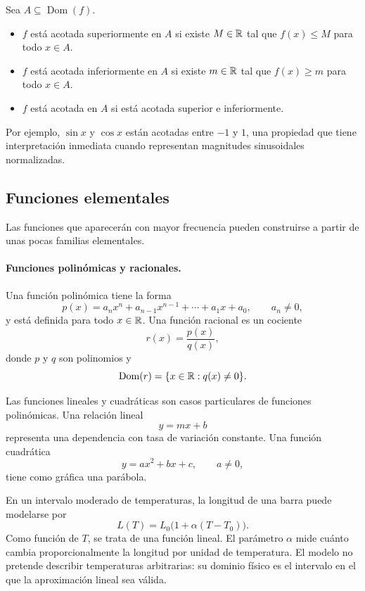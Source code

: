 \begin{definition}[Acotación]
Sea $A\subseteq\operatorname{Dom}(f)$.
\begin{itemize}
\item $f$ está acotada superiormente en $A$ si existe $M\in\mathbb{R}$ tal que $f(x)\leq M$ para todo $x\in A$.
\item $f$ está acotada inferiormente en $A$ si existe $m\in\mathbb{R}$ tal que $f(x)\geq m$ para todo $x\in A$.
\item $f$ está acotada en $A$ si está acotada superior e inferiormente.
\end{itemize}
\end{definition}

Por ejemplo, $\sin x$ y $\cos x$ están acotadas entre $-1$ y $1$, una propiedad que tiene interpretación inmediata cuando representan magnitudes sinusoidales normalizadas.

\subsection{Funciones elementales}

Las funciones que aparecerán con mayor frecuencia pueden construirse a partir de unas pocas familias elementales.

\paragraph{Funciones polinómicas y racionales.}
Una función polinómica tiene la forma
\[
p(x)=a_nx^n+a_{n-1}x^{n-1}+\cdots+a_1x+a_0,
\qquad a_n\neq0,
\]
y está definida para todo $x\in\mathbb{R}$. Una función racional es un cociente
\[
r(x)=\frac{p(x)}{q(x)},
\]
donde $p$ y $q$ son polinomios y
\[
\operatorname{Dom}(r)=\{x\in\mathbb{R}:q(x)\neq0\}.
\]

Las funciones lineales y cuadráticas son casos particulares de funciones polinómicas. Una relación lineal
\[
y=mx+b
\]
representa una dependencia con tasa de variación constante. Una función cuadrática
\[
y=ax^2+bx+c,
\qquad a\neq0,
\]
tiene como gráfica una parábola.

\begin{example}
En un intervalo moderado de temperaturas, la longitud de una barra puede modelarse por
\[
L(T)=L_0\bigl(1+\alpha(T-T_0)\bigr).
\]
Como función de $T$, se trata de una función lineal. El parámetro $\alpha$ mide cuánto cambia proporcionalmente la longitud por unidad de temperatura. El modelo no pretende describir temperaturas arbitrarias: su dominio físico es el intervalo en el que la aproximación lineal sea válida.
\end{example}

